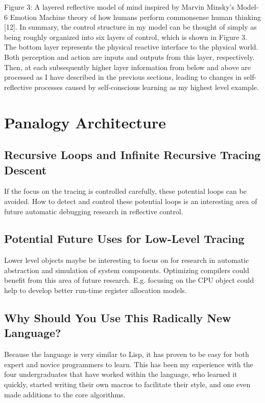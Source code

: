 Figure 3: A layered reflective model of mind inspired by Marvin
Minsky's Model-6 Emotion Machine theory of how humans perform
commonsense human thinking [12].  In summary, the control structure in
my model can be thought of simply as being roughly organized into six
layers of control, which is shown in Figure 3. The bottom layer
represents the physical reactive interface to the physical world. Both
perception and action are inputs and outputs from this layer,
respectively. Then, at each subsequently higher layer information from
below and above are processed as I have described in the previous
sections, leading to changes in self-reflective processes caused by
self-conscious learning as my highest level example.




\section{Panalogy Architecture}



\subsection{Recursive Loops and Infinite Recursive Tracing Descent}

If the focus on the tracing is controlled carefully, these potential
loops can be avoided.  How to detect and control these potential loops
is an interesting area of future automatic debugging research in
reflective control.

\subsection{Potential Future Uses for Low-Level Tracing}

Lower level objects maybe be interesting to focus on for research in
automatic abstraction and simulation of system components.  Optimizing
compilers could benefit from this area of future research.  E.g.
focusing on the CPU object could help to develop better run-time
register allocation models.

\subsection{Why Should You Use This Radically New Language?}

Because the language is very similar to Lisp, it has proven to be easy
for both expert and novice programmers to learn.  This has been my
experience with the four undergraduates that have worked within the
language, who learned it quickly, started writing their own macros to
facilitate their style, and one even made additions to the core
algorithms.

